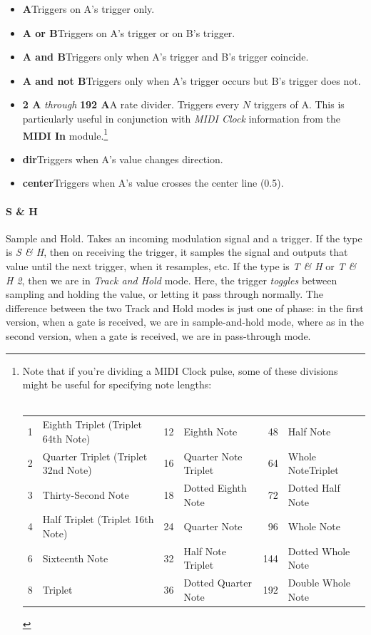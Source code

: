 \documentclass{article}
\begin{document}
\begin{itemize}
\item {\bf A}\quad Triggers on A's trigger only.
\item {\bf A or B}\quad Triggers on A's trigger or on B's trigger.
\item {\bf A and B}\quad Triggers only when A's trigger and B's trigger coincide.
\item {\bf A and not B}\quad Triggers only when A's trigger occurs but B's trigger does not.
\item {\bf 2 A} {\it through} {\bf 192 A}\quad A rate divider.  Triggers every \(N\) triggers of A.  This is particularly useful in conjunction with {\it MIDI Clock} information from the {\bf MIDI In} module.\footnote{Note that if you're dividing a MIDI Clock pulse, some of these divisions might be useful for specifying note lengths:\\
\\
\begin{tabular}{rlrlrl}
	1&	Eighth Triplet (Triplet 64th Note)	&12&	Eighth Note							&48&	Half Note		\\
	2&	Quarter Triplet (Triplet 32nd Note)	&16&	Quarter Note Triplet					&64&	Whole NoteTriplet\\
	3&	Thirty-Second Note				&18&	Dotted Eighth Note				&72&	Dotted Half Note\\
	4&	Half Triplet (Triplet 16th Note)		&24&	Quarter Note				&96&	Whole Note\\
	6&	Sixteenth Note					&32&	Half Note Triplet				&144&	Dotted Whole Note\\
	8&	Triplet								&36&	Dotted Quarter Note									&192&	Double Whole Note\\
\end{tabular}\vspace{1em}
}
\item{\bf dir}\quad Triggers when A's value changes direction.
\item{\bf center}\quad Triggers when A's value crosses the center line (0.5).
\end{itemize}

\paragraph{S \& H}  Sample and Hold.  Takes an incoming modulation signal and a trigger.  If the type is {\it S \& H}, then on receiving the trigger, it samples the signal and outputs that value until the next trigger, when it resamples, etc.  If the type is {\it T \& H} or {\it T \& H 2}, then we are in {\it Track and Hold} mode.  Here, the trigger {\it toggles} between sampling and holding the value, or letting it pass through normally.  The difference between the two Track and Hold modes is just one of phase: in the first version, when a gate is received, we are in sample-and-hold mode, where as in the second version, when a gate is received, we are in pass-through mode.
\end{document}
